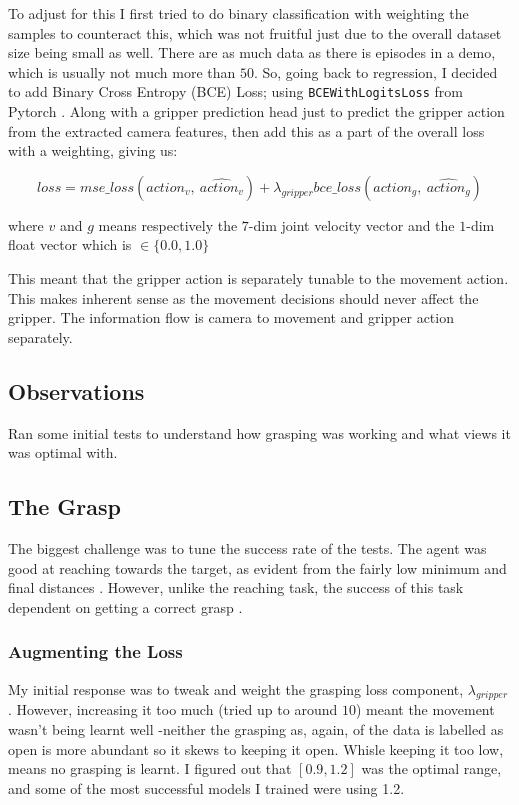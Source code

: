 To adjust for this I first tried to do binary classification with weighting the samples to counteract this, which was not fruitful just due to the overall dataset size being small as well. There are as much data as there is episodes in a demo, which is usually not much more than $50$. So, going back to regression, I decided to add Binary Cross Entropy (BCE) Loss; using \verb|BCEWithLogitsLoss| from Pytorch . Along with a gripper prediction head just to predict the gripper action from the extracted camera features, then add this as a part of the overall loss with a weighting, giving us:

\[
  loss = mse\_loss \left(action_{v}, ~\hat{action_v}\right) 
  + 
  \lambda_{gripper} bce\_loss\left( action_{g}, ~\hat{action_g}\right)
\]

where $v$ and $g$ means respectively the $7$-dim joint velocity vector and the $1$-dim float vector which is \( \in \{ 0.0, 1.0 \}\)

This meant that the gripper action is separately tunable to the movement action. This makes inherent sense as the movement decisions should never affect the gripper. The information flow is camera to movement and gripper action separately.  



\subsection{Observations}
Ran some initial tests to understand how grasping was working and what views it was optimal with.

\subsection{The Grasp}
The biggest challenge was to tune the success rate of the tests. The agent was good at reaching towards the target, as evident from the fairly low minimum and final distances . However, unlike the reaching task, the success of this task dependent on getting a correct grasp . 

\subsubsection{Augmenting the Loss}
My initial response was to tweak and weight the grasping loss component, $\lambda_{gripper}$. However, increasing it too much (tried up to around $10$) meant the movement wasn't being learnt well -neither the grasping as, again, of the data is labelled as open is more abundant so it skews to keeping it open. Whisle keeping it too low, means no grasping is learnt. I figured out that \(\left[0.9, 1.2\right]\) was the optimal range, and some of the most successful models I trained were using 1.2.

